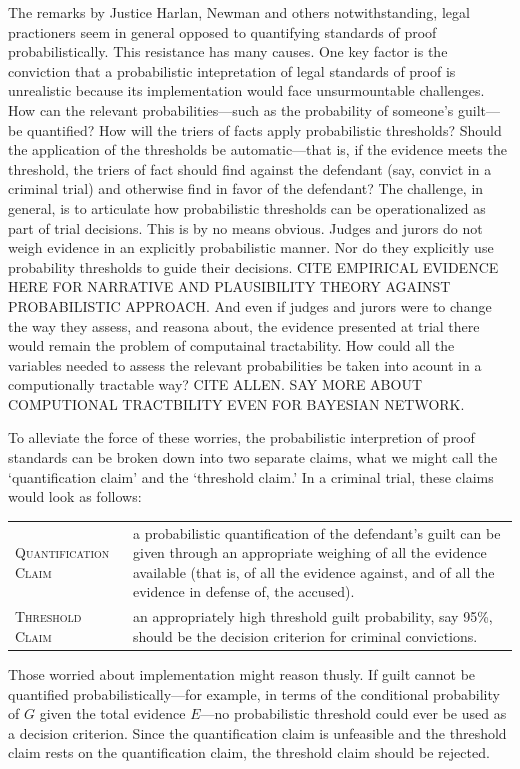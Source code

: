 \documentclass[
  10pt,
  dvipsnames,enabledeprecatedfontcommands]{scrartcl}
\begin{document}
The remarks by Justice Harlan, Newman and others notwithstanding, legal
practioners seem in general opposed to quantifying standards of proof
probabilistically. This resistance has many causes. One key factor is
the conviction that a probabilistic intepretation of legal standards of
proof is unrealistic because its implementation would face
unsurmountable challenges. How can the relevant probabilities---such as
the probability of someone's guilt---be quantified? How will the triers
of facts apply probabilistic thresholds? Should the application of the
thresholds be automatic---that is, if the evidence meets the threshold,
the triers of fact should find against the defendant (say, convict in a
criminal trial) and otherwise find in favor of the defendant? The
challenge, in general, is to articulate how probabilistic thresholds can
be operationalized as part of trial decisions. This is by no means
obvious. Judges and jurors do not weigh evidence in an explicitly
probabilistic manner. Nor do they explicitly use probability thresholds
to guide their decisions. CITE EMPIRICAL EVIDENCE HERE FOR NARRATIVE AND
PLAUSIBILITY THEORY AGAINST PROBABILISTIC APPROACH. And even if judges
and jurors were to change the way they assess, and reasona about, the
evidence presented at trial there would remain the problem of
computainal tractability. How could all the variables needed to assess
the relevant probabilities be taken into acount in a computionally
tractable way? CITE ALLEN. SAY MORE ABOUT COMPUTIONAL TRACTBILITY EVEN
FOR BAYESIAN NETWORK.

To alleviate the force of these worries, the probabilistic interpretion
of proof standards can be broken down into two separate claims, what we
might call the `quantification claim' and the `threshold claim.' In a
criminal trial, these claims would look as follows:

\begin{tabular}{lp{8.5cm}}
 \textsc{Quantification Claim} & a probabilistic quantification of the defendant's guilt can 
 be given through an appropriate weighing of all the evidence available (that is, of all the evidence against, and of all the evidence in defense of, the accused).\\
 \textsc{Threshold Claim} & an appropriately high threshold guilt probability, say 95\%, 
 should be the decision criterion for criminal convictions.
  \end{tabular}

\noindent Those worried about implementation might reason thusly. If
guilt cannot be quantified probabilistically---for example, in terms of
the conditional probability of \(G\) given the total evidence \(E\)---no
probabilistic threshold could ever be used as a decision criterion.
Since the quantification claim is unfeasible and the threshold claim
rests on the quantification claim, the threshold claim should be
rejected.
\end{document}
